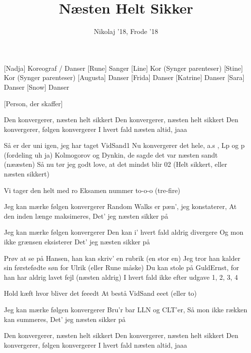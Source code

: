 \documentclass[a4paper,11pt]{article}
\title{Næsten Helt Sikker}
\author{Nikolaj '18, Frode '18}
\begin{document}
\maketitle

\begin{roles}
[Nadja] Koreograf / Danser
[Rune] Sanger
[Line] Kor (Synger parenteser)
[Stine] Kor (Synger parenteser)
[Augusta] Danser
[Frida] Danser
[Katrine] Danser
[Sara] Danser
[Snow] Danser
\end{roles}

\begin{props}
[Person, der skaffer]
\end{props}

\begin{song}
%
Den konvergerer, næsten helt sikkert
Den konvergerer, næsten helt sikkert
Den konvergerer, følgen konvergerer
I hvert fald næsten altid, jaaa

%
Så er der uni igen, jeg har taget VidSand1
Nu konvergerer det hele, a.s , Lp og p (fordeling uh ja)
Kolmogorov og Dynkin, de sagde det var næsten sandt
(nææsten)
Så nu tør jeg godt love, at det mindst blir 02
(Helt sikkert, eller næsten sikkert)

%
Vi tager den helt med ro
Eksamen nummer to-o-o (tre-fire)

%
Jeg kan mærke følgen konvergerer
Random Walks er pæn', jeg konstaterer, 
At den inden længe maksimeres,
Det' jeg næsten sikker på

Jeg kan mærke følgen konvergerer
Den kan i' hvert fald aldrig divergere
Og mon ikke grænsen eksisterer
Det' jeg næsten sikker på



%
Prøv at se på Hansen, han kan skriv' en rubrik (en stor en)
Jeg tror han kalder sin førstefødte søn for Ulrik
(eller Rune måske)
Du kan stole på GuldErnst, for han har aldrig lavet fejl
(næsten aldrig)
I hvert fald ikke efter udgave 1, 2, 3, 4

%
Hold kæft hvor bliver det feeedt
At bestå VidSand eeet (eller to)

%
Jeg kan mærke følgen konvergerer
Bru'r bar LLN og CLT'er,
Så mon ikke rækken kan summeres,
Det' jeg næsten sikker på

%
Den konvergerer, næsten helt sikkert
Den konvergerer, næsten helt sikkert
Den konvergerer, følgen konvergerer
I hvert fald næsten altid, jaaa


\end{song}
\end{document}
